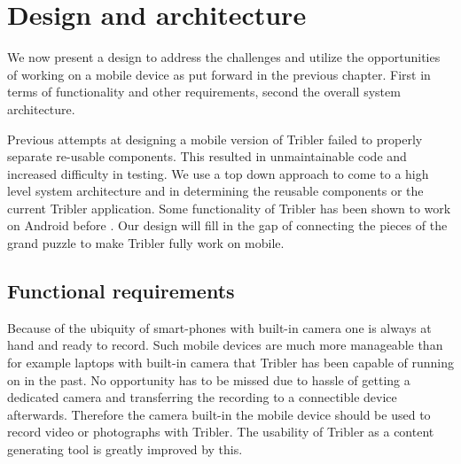 \chapter{Design and architecture}
\label{ch:design}

We now present a design to address the challenges and utilize the opportunities of working on a mobile device as put forward in the previous chapter.
First in terms of functionality and other requirements, second the overall system architecture.

Previous attempts at designing a mobile version of Tribler failed to properly separate re-usable components.
This resulted in unmaintainable code and increased difficulty in testing.
We use a top down approach to come to a high level system architecture and in determining the reusable components or the current Tribler application.
Some functionality of Tribler has been shown to work on Android before \cite{bsc1,2,3}.
Our design will fill in the gap of connecting the pieces of the grand puzzle to make Tribler fully work on mobile.


\section{Functional requirements}


Because of the ubiquity of smart-phones with built-in camera one is always at hand and ready to record.
Such mobile devices are much more manageable than for example laptops with built-in camera that Tribler has been capable of running on in the past.
No opportunity has to be missed due to hassle of getting a dedicated camera and transferring the recording to a connectible device afterwards.
Therefore the camera built-in the mobile device should be used to record video or photographs with Tribler.
The usability of Tribler as a content generating tool is greatly improved by this. 

